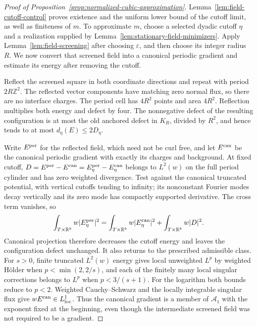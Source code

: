 \begin{proof}[Proof of Proposition~\ref{prop:normalized-cubic-approximation}]
Lemma~\ref{lem:field-cutoff-control} proves existence and the uniform lower
bound of the cutoff limit, as well as finiteness of $m$. To approximate $m$,
choose a selected dyadic cutoff $\eta$ and a realization supplied by
Lemma~\ref{lem:stationary-field-minimizers}. Apply
Lemma~\ref{lem:field-screening} after choosing $\varepsilon$, and then
choose its integer radius $R$. We now convert that screened field into a
canonical periodic gradient and estimate its energy after removing the
cutoff.

Reflect the screened square in both coordinate directions and repeat
with period $2R\mathbb Z^2$.  The reflected vector components have
matching zero normal flux, so there are no interface charges.  The
period cell has $4R^2$ points and area $4R^2$.
Reflection multiplies both energy and defect by four.  The nonnegative
defect of the resulting configuration is at most the old anchored
defect in $K_R$, divided by $R^2$, and hence tends to at most
$d_\eta(E)\le2D_\eta$.

Write $E^{\rm per}$ for the reflected field, which need not be curl free,
and let $E^{\rm can}$ be the canonical periodic gradient with exactly
its charges and background. At fixed cutoff,
$D=E^{\rm per}-E^{\rm can}=E^{\rm per}_\eta-E^{\rm can}_\eta$
belongs to $L^2(w)$ on the full period cylinder and has zero weighted
divergence.  Test against the canonical truncated potential, with
vertical cutoffs tending to infinity; its nonconstant Fourier modes
decay vertically and its zero mode has compactly supported derivative.
The cross term vanishes, so
\[
 \int_{T\times\mathbb R^k}w|E^{\rm per}_\eta|^2
  =\int_{T\times\mathbb R^k}w|E^{\rm can}_\eta|^2
                       +\int_{T\times\mathbb R^k}w|D|^2.
\]
Canonical projection therefore decreases the cutoff energy and leaves
the configuration defect unchanged. It also returns to the prescribed
admissible class. For $s>0$, finite truncated $L^2(w)$ energy gives local
unweighted $L^p$ by weighted H\"older when $p<\min(2,2/s)$, and each of
the finitely many local singular corrections belongs to $L^p$ when
$p<3/(s+1)$.
For the logarithm both bounds reduce to $p<2$. Weighted Cauchy--Schwarz
and the locally integrable singular flux give $wE^{\rm can}\in
L^1_{\rm loc}$. Thus the canonical gradient is a member of
$\mathcal A_1$ with the exponent fixed at the beginning, even though the
intermediate screened field was not required to be a gradient.


\end{proof}
